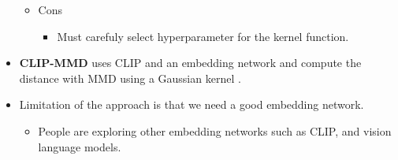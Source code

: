 \documentclass[10pt]{article}
\begin{document}
\begin{itemize}
\begin{itemize}
        \item Cons
        \begin{itemize}
            \item Must carefuly select hyperparameter for the kernel function.
        \end{itemize}
    \end{itemize}

    \item {\bf CLIP-MMD} uses CLIP and an embedding network and compute the distance with MMD using a Gaussian kernel \cite{Jayasumana:2024}.    

    \item Limitation of the approach is that we need a good embedding network.
    \begin{itemize}
        \item People are exploring other embedding networks such as CLIP, and vision language models.
    \end{itemize}
\end{itemize}


  
\end{document}
